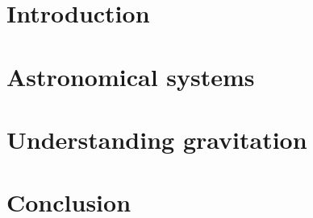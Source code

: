 \documentclass[a4paper, 11pt, titlepage, twoside]{book}
\def\today{\number\day\space\ifcase\month\or January\or February\or March\or April\or May\or June\or July\or August\or September\or October\or November\or December\fi\space\number\year}
\begin{document}
\author{{\LARGE{}Christopher P.\ L.\ Berry}\vspace{2mm}\\
Churchill College and Institute of Astronomy\\
\vspace{1mm}}

\date{\texttt{[image: ../UC-shield/uc-shield-black.eps]}\vspace{14mm}
\\{This dissertation is submitted for the degree of}\vspace{1mm}\\{\sc\LARGE{}Doctor of Philosophy}\vspace{3mm}
\\{\Large{}Supervisor: Jonathan R.\ Gair}\vspace{11mm}
\\{\Large\today}}

\maketitle



\tableofcontents

\mainmatter

\part{Introduction}



\part{Astronomical systems}







\part{Understanding gravitation}



\part{Conclusion}
\end{document}
